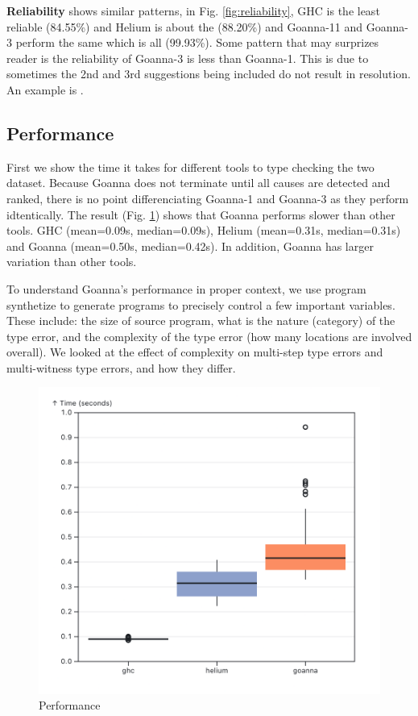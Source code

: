 \documentclass[pdflatex,sn-mathphys-num]{sn-jnl}%
\begin{document}
  \textbf{Reliability} shows similar patterns, in Fig. \ref{fig:reliability}, GHC is the least reliable (84.55\%) and Helium is about the (88.20\%) and Goanna-11 and Goanna-3 perform the same which is all (99.93\%). Some pattern that may surprizes reader is the reliability of Goanna-3 is less than Goanna-1. This is due to sometimes the 2nd and 3rd suggestions being included do not result in resolution. An example is .

   
    \subsection{Performance} \label{sub:eval-performacne}
    First we show the time it takes for different tools to type checking the two dataset. Because Goanna does not terminate until all causes are detected and ranked, there is no point differenciating Goanna-1 and Goanna-3 as they perform idtentically. The result (Fig. \ref{fig:performance}) shows that Goanna performs slower than other tools. GHC (mean=0.09s, median=0.09s), Helium (mean=0.31s, median=0.31s) and Goanna (mean=0.50s, median=0.42s). In addition, Goanna has larger variation than other tools.

    To understand Goanna's performance in proper context, we use program synthetize to generate programs to precisely control a few important variables.  These include: the size of source program, what is the nature (category) of the type error, and the complexity of the type error (how many locations are involved overall).  We looked at the effect of complexity on multi-step type errors and multi-witness type errors, and how they differ. 


   \begin{figure}[ht!]
        \centering
        \includegraphics[width=0.7\linewidth]{images/performance-overall.png}
        \caption{Performance} 
        \label{fig:performance}
    \end{figure}
    
\end{document}
